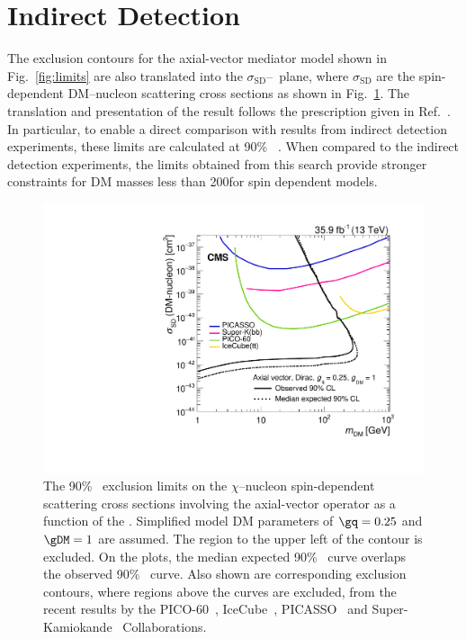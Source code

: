 \section{Indirect Detection}

The exclusion contours for the axial-vector mediator model shown in Fig.~\ref{fig:limits} are also translated into the $\sigma_{\text{SD}}$--\mdm\ plane, where $\sigma_{\text{SD}}$ are the spin-dependent DM--nucleon scattering cross sections as shown in Fig.~\ref{fig:limits_indirect}. 
The translation and presentation of the result follows the prescription given in Ref.~\cite{Boveia:2016mrp}.
In particular, to enable a direct comparison with results from indirect detection experiments, these limits are calculated at 90\% \CL~\cite{dmforum}.
When compared to the indirect detection experiments, the limits obtained from this search provide stronger constraints for DM masses less than 200\GeV for spin dependent models.

\begin{figure}[htbp]
  \centering
    \includegraphics[width=0.48\linewidth]{Impact/Figures/limits_indirect.pdf}
    \caption{
      The 90\% \CL\ exclusion limits on the $\chi$--nucleon spin-dependent scattering cross sections involving the axial-vector operator as a function of the \mdm.
      Simplified model DM parameters of $\gq=0.25$ and $\gDM=1$ are assumed.
      The region to the upper left of the contour is excluded. 
      On the plots, the median expected 90\% \CL\ curve overlaps the observed 90\% \CL\ curve.
      Also shown are corresponding exclusion contours, where regions above the curves are excluded, from the recent results by the PICO-60~\cite{Amole:2017dex}, IceCube~\cite{Aartsen:2016exj}, PICASSO~\cite{Behnke:2016lsk} and Super-Kamiokande~\cite{Choi:2015ara} Collaborations.
    }
    \label{fig:limits_indirect}
\end{figure}
